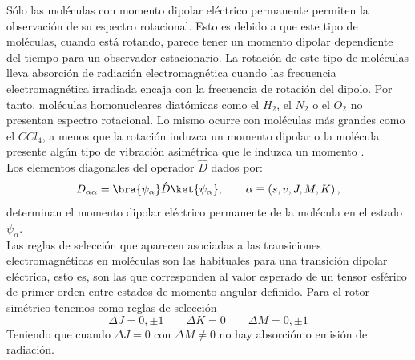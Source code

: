 \documentclass[a4paper]{article}
\begin{document}
Sólo las moléculas con momento dipolar eléctrico permanente permiten la observación de su espectro rotacional.  Esto es debido a que este tipo de moléculas, cuando está rotando, parece tener un momento dipolar dependiente del tiempo para un observador estacionario. La rotación de este tipo de moléculas lleva absorción de radiación electromagnética cuando las frecuencia electromagnética irradiada encaja con la frecuencia de rotación del dipolo. Por tanto, moléculas homonucleares diatómicas como el $H_2$, el $N_2$ o el $O_2$ no presentan espectro rotacional. Lo mismo ocurre con moléculas más grandes como el $CCl_4$, a menos que la rotación induzca un momento dipolar o la molécula presente algún tipo de vibración asimétrica que le induzca un momento \cite{haken2013}.\\
 
Los elementos diagonales del operador $\hat D$ dados por:
\begin{equation}
D_{\alpha\alpha}=\bra{\psi_\alpha}\hat D\ket{\psi_\alpha},\qquad \alpha \equiv \left(s,v,J,M,K\right),
\end{equation}
determinan el momento dipolar eléctrico permanente de la molécula en el estado $\psi_\alpha$.\\

Las reglas de selección que aparecen asociadas a las transiciones electromagnéticas en moléculas son las habituales para una transición dipolar eléctrica, esto es, son las que corresponden al valor esperado de un tensor esférico de primer orden entre estados de momento angular definido.
Para el rotor simétrico tenemos como reglas de selección
\begin{equation}
\Delta J = 0,\pm 1 \qquad\Delta K =0 \qquad \Delta M = 0, \pm 1
\end{equation}
Teniendo que cuando $\Delta J = 0$ con $\Delta M \neq 0$ no hay absorción o emisión de radiación.\\
\end{document}

